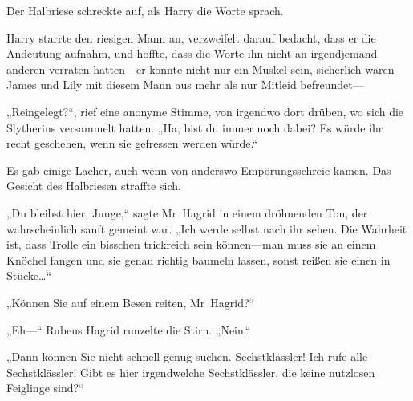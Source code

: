Der Halbriese schreckte auf, als Harry die Worte sprach.

Harry starrte den riesigen Mann an, verzweifelt darauf bedacht, dass er die Andeutung aufnahm, und hoffte, dass die Worte ihn nicht an irgendjemand anderen verraten hatten—er konnte nicht nur ein Muskel sein, sicherlich waren James und Lily mit diesem Mann aus mehr als nur Mitleid befreundet—

„Reingelegt?“, rief eine anonyme Stimme, von irgendwo dort drüben, wo sich die Slytherins versammelt hatten. „Ha, bist du immer noch dabei? Es würde ihr recht geschehen, wenn sie gefressen werden würde.“

Es gab einige Lacher, auch wenn von anderswo Empörungsschreie kamen. Das Gesicht des Halbriesen straffte sich.

„Du bleibst hier, Junge,“ sagte Mr~Hagrid in einem dröhnenden Ton, der wahrscheinlich sanft gemeint war. „Ich werde selbst nach ihr sehen. Die Wahrheit ist, dass Trolle ein bisschen trickreich sein können—man muss sie an einem Knöchel fangen und sie genau richtig baumeln lassen, sonst reißen sie einen in Stücke…“

„Können Sie auf einem Besen reiten, Mr~Hagrid?“

„Eh—“ Rubeus Hagrid runzelte die Stirn. „Nein.“

„Dann können Sie nicht schnell genug suchen. Sechstklässler! Ich rufe alle Sechstklässler! Gibt es hier irgendwelche Sechstklässler, die keine nutzlosen Feiglinge sind?“

